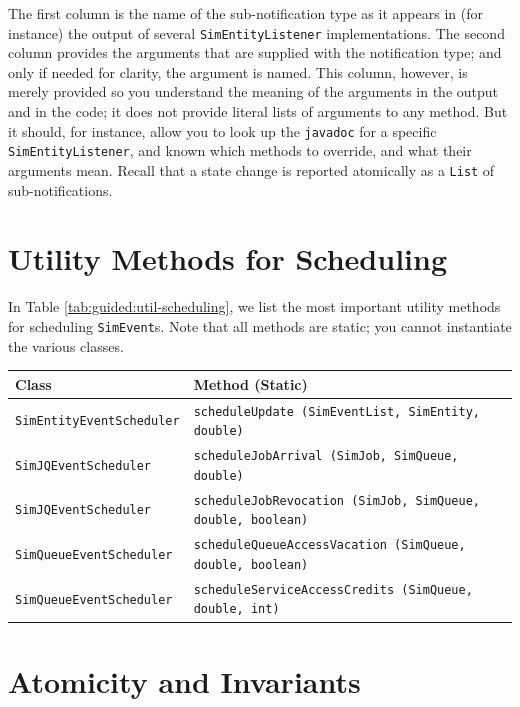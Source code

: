 The first column is the name of the sub-notification type
  as it appears in (for instance) the output of
  several \lstinline|SimEntityListener|
  implementations.
The second column provides the arguments
  that are supplied with the notification type;
  and only if needed for clarity, the argument is named.
This column, however,
  is merely provided so you understand the meaning of the
  arguments in the output
  and in the code;
  it does not provide literal lists of arguments to any method.
But it should, for instance, allow you
  to look up the \lstinline|javadoc|
  for a specific \lstinline|SimEntityListener|,
  and known which methods to override,
  and what their arguments mean.
Recall that a state change is reported
  atomically
  as a \lstinline|List| of sub-notifications.

\section{Utility Methods for Scheduling}

In Table \ref{tab:guided:util-scheduling},
  we list the most important utility methods for scheduling
  \lstinline|SimEvent|s.
Note that all methods are static; you cannot instantiate the
  various classes.

\begin{table}[!htbp]
\label{tab:guided:util-scheduling}
\caption{Utility Methods for Scheduling.}
\begin{longtabu}{|l|l|}
\hline
Class & Method (Static) \\ \hline
\lstinline|SimEntityEventScheduler| & \lstinline|scheduleUpdate (SimEventList, SimEntity, double)|
  \\ \hline
\lstinline|SimJQEventScheduler|     & \lstinline|scheduleJobArrival (SimJob, SimQueue, double)|
  \\ \hline
\lstinline|SimJQEventScheduler|     & \lstinline|scheduleJobRevocation (SimJob, SimQueue, double, boolean)|
  \\ \hline
\lstinline|SimQueueEventScheduler|  & \lstinline|scheduleQueueAccessVacation (SimQueue, double, boolean)|
  \\ \hline
\lstinline|SimQueueEventScheduler|  & \lstinline|scheduleServiceAccessCredits (SimQueue, double, int)|
  \\ \hline
\end{longtabu}
\end{table}

\section{Atomicity and Invariants}
\label{sec:atomicity-invariants}

